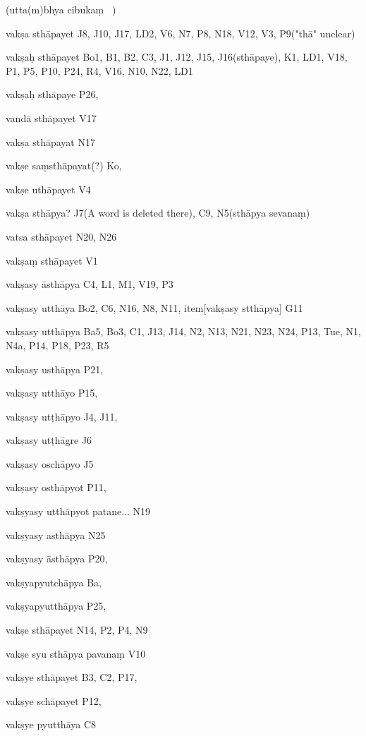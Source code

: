 \begin{ekdosis}
 \begin{marma}[hp01_046]
\item[(utta(m)bhya cibukaṃ ~)]
\item[vakṣa sthāpayet ]    J8, J10, J17, LD2, V6, N7, P8, N18, V12, V3, P9("thā" unclear)
\item[vakṣaḥ sthāpayet]     Bo1, B1, B2, C3, J1, J12, J15, J16(sthāpaye),  K1, LD1, V18, P1, P5, P10, P24, R4, V16, N10, N22, LD1
\item[vakṣaḥ sthāpaye]     P26, 
\item[vandā sthāpayet]    V17
\item[vakṣa sthāpayat]     N17
\item[vakṣe saṃsthāpayat(?)]    Ko,
\item[vakṣe uthāpayet]    V4
\item[vakṣa sthāpya?]    J7(A word is deleted there), C9, N5(sthāpya sevanaṃ)
\item[vatsa sthāpayet ]    N20, N26
\item[vakṣaṃ sthāpayet]     V1
\item[vakṣasy āsthāpya]     C4, L1, M1, V19, P3
\item[vakṣasy utthāya]    Bo2, C6, N16, N8, N11,
item[vakṣasy stthāpya] G11
\item[vakṣasy utthāpya] Ba5, Bo3, C1, J13, J14, N2, N13, N21, N23, N24, P13, Tue, N1, N4a, P14, P18, P23,  R5
\item[vakṣasy usthāpya] P21,
\item[vakṣasy utthāyo] P15,
\item[vakṣasy utṭhāpyo]    J4, J11,
\item[vakṣasy utṭhāgre]    J6
\item[vakṣasy oschāpyo]    J5
\item[vakṣasy osthāpyot]    P11, 
\item[vakṣyasy utthāpyot patane...]    N19
\item[vakṣyasy asthāpya]    N25
\item[vakṣyasy āsthāpya]    P20,
\item[vakṣyapyutchāpya]    Ba, 
\item[vakṣyapyutthāpya]    P25, 
\item[vakṣe sthāpayet]    N14, P2, P4, N9
\item[vakṣe syu sthāpya pavanaṃ]     V10
\item[vakṣye sthāpayet]    B3, C2, P17, 
\item[vakṣye schāpayet]    P12, 
\item[vakṣye pyutthāya]    C8

\end{marma}
\end{ekdosis}
